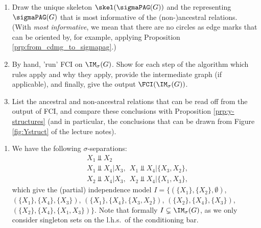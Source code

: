 \begin{enumerate}
\begin{enumerate}
 	\emph{Hint: instead of checking this for all graphs individually, you can use exercise (a) and Proposition \ref*{prp:sigma-inducing_path_properties}}
	\item %
	Draw the unique skeleton $\skel(\sigmaPAG(G))$ and the representing $\sigmaPAG(G)$ that is most informative of the (non-)ancestral relations. (With \emph{most informative}, we mean that there are no circles as edge marks that can be oriented by, for example, applying Proposition \ref*{prp:from_cdmg_to_sigmapag}.)
	\item %
	By hand, 'run' FCI on $\IM_\sigma(G)$. Show for each step of the algorithm which rules apply and why they apply, provide the intermediate graph (if applicable), and finally, give the output $\FCI(\IM_\sigma(G))$.
	\item %
	List the ancestral and non-ancestral relations that can be read off from the output of FCI, and compare these conclusions with Proposition \ref*{prp:y-structures} (and in particular, the conclusions that can be drawn from Figure \ref*{fig:Ystruct} of the lecture notes).
\end{enumerate}
\begin{ungradedsolution}
	\begin{enumerate}
		\item We have the following $\sigma$-separations:
		\begin{align*}
			&X_1 \Perp X_2 \\
			&X_1\Perp X_4|X_3, ~~ X_1\Perp X_4|\{X_3, X_2\}, \\
			&X_2\Perp X_4|X_3, ~~ X_2\Perp X_4|\{X_1, X_3\},
		\end{align*}
		which give the (partial) independence model $I = \{(\{X_1\}, \{X_2\}, \emptyset)$, $(\{X_1\}, \{X_4\}, \{X_3\})$, $(\{X_1\}, \{X_4\}, \{X_3, X_2\})$, $(\{X_2\}, \{X_4\}, \{X_3\})$, $(\{X_2\}, \{X_4\}, \{X_1, X_3\})\}$. Note that formally $I\subsetneq \IM_\sigma(G)$, as we only consider singleton sets on the l.h.s.\ of the conditioning bar.

\end{enumerate}
\end{ungradedsolution}
\end{enumerate}
